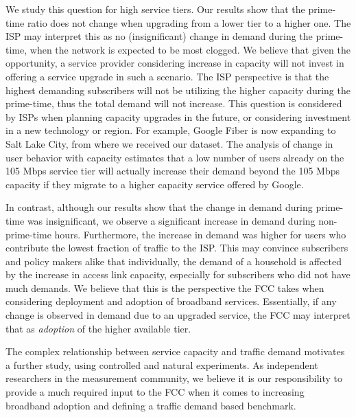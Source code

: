 We study this question for high service tiers. Our results show that the 
prime-time ratio does not change when upgrading from a lower tier to a higher 
one. The ISP may interpret this as no (insignificant) change in demand during 
the prime-time, when the network is expected to be most clogged. We
believe that given the opportunity, a service provider considering increase in 
capacity will not invest in offering a service upgrade in such a scenario. The 
ISP perspective is that the highest demanding subscribers will not be utilizing 
the higher capacity during the prime-time, thus the total demand will not 
increase. This question is considered by ISPs when planning capacity upgrades 
in the future, or considering investment in a new technology or region. For 
example, Google Fiber is now expanding to Salt Lake City, from where 
we received our dataset. The analysis of change in user behavior with capacity 
estimates that a low number of users already on the 105 Mbps service tier will 
actually increase their demand beyond the 105 Mbps capacity if they 
migrate to a higher capacity service offered by Google. 

In contrast, although our results show that the change in demand during 
prime-time was insignificant, we observe a significant increase in demand 
during non-prime-time hours. Furthermore, the increase in demand was higher for 
users who contribute the lowest fraction of traffic to the ISP. This may 
convince subscribers and policy makers alike that individually, the demand of a 
household is affected by the increase in access link capacity, especially for 
subscribers who did not have much demands. We believe that this is the 
perspective the FCC takes when considering deployment and adoption of 
broadband services. Essentially, if any change is observed in demand due to an 
upgraded service, the FCC may interpret that as \emph{adoption} of the higher 
available tier.

The complex relationship between service capacity and traffic demand motivates 
a further study, using controlled and natural experiments. As independent 
researchers in the measurement community, we believe it is our responsibility to 
provide a much required input to the FCC when it comes to increasing broadband 
adoption and defining a traffic demand based benchmark.
